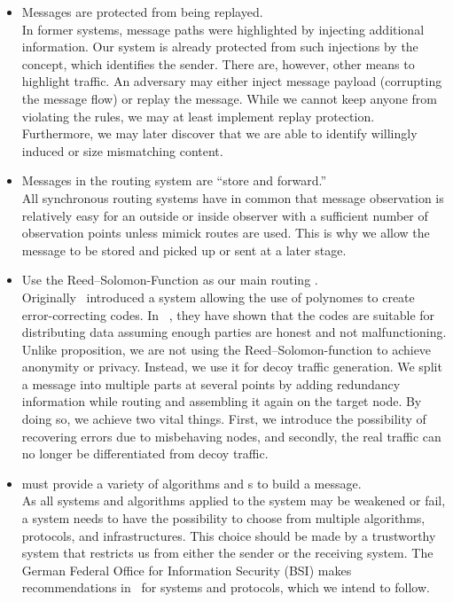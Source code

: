 \begin{itemize}
	\item Messages are protected from being replayed.\\
	In former systems, message paths were highlighted by injecting additional information. Our system is already protected from such injections by the  concept, which identifies the sender. There are, however, other means to highlight traffic. An adversary may either inject message payload (corrupting the message flow) or replay the message. While we cannot keep anyone from violating the rules, we may at least implement replay protection. Furthermore, we may later discover that we are able to identify willingly induced or size mismatching content.
	\item Messages in the routing system are ``store and forward.''\\
	All synchronous routing systems have in common that message observation is relatively easy for an outside or inside observer with a sufficient number of observation points unless mimick routes are used. This is why we allow the message to be stored and picked up or sent at a later stage. 
	\item Use the Reed--Solomon-Function as our main routing .\\
	Originally~\cite{reed1960polynomial} introduced a system allowing the use of polynomes to create error-correcting codes. In~\cite{chaum1988multiparty} \citeauthor{chaum1988multiparty}, they have shown that the codes are suitable for distributing data assuming enough parties are honest and not malfunctioning. Unlike \citeauthor{chaum1988multiparty} proposition, we are not using the Reed--Solomon-function to achieve anonymity or privacy. Instead, we use it for decoy traffic generation. We split a message into multiple parts at several points by adding redundancy information while routing and assembling it again on the target node. By doing so, we achieve two vital things. First, we introduce the possibility of recovering errors due to misbehaving nodes, and secondly, the real traffic can no longer be differentiated from decoy traffic. 
	\item \MessageVortex{} must provide a variety of algorithms and s to build a message.\\        
	As all systems and algorithms applied to the system may be weakened or fail, a system needs to have the possibility to choose from multiple algorithms, protocols, and infrastructures. This choice should be made by a trustworthy system that restricts us from either the sender or the receiving system. The German Federal Office for Information Security (BSI) makes recommendations in~\cite{bsiPostQuantum} for systems and protocols, which we intend to follow.
	

\end{itemize}
